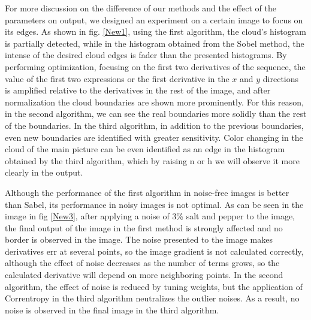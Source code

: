 \documentclass{elsarticle}
\begin{document}
For more discussion on the difference of our methods and the effect of the parameters on output, we designed an experiment on a certain image to focus on its edges.
As shown in fig. \ref{New1}, using the first algorithm, the cloud’s histogram is partially detected, while in the histogram obtained from the Sobel method, the intense of the desired cloud edges is fader than the presented histograms.
By performing optimization, focusing on the first two derivatives of the sequence, the value of the first two expressions or the first derivative in the $x$ and $y$ directions is amplified relative to the derivatives in the rest of the image, and after normalization the cloud boundaries are shown more prominently. For this reason, in the second algorithm, we can see the real boundaries more solidly than the rest of the boundaries. In the third algorithm, in addition to the previous boundaries, even new boundaries are identified with greater sensitivity. Color changing in the cloud of the main picture can be even identified as an edge in the histogram obtained by the third algorithm, which by raising n or h we will observe it more clearly in the output. 

Although the performance of the first algorithm in noise-free images is better than Sabel, its performance in noisy images is not optimal. As can be seen in the image in fig \ref{New3}, after applying a noise of 3\% salt and pepper to the image, the final output of the image in the first method is strongly affected and no border is observed in the image. The noise presented to the image makes derivatives err at several points, so the image gradient is not calculated correctly, although the effect of noise decreases as the number of terms grows, so the calculated derivative will depend on more neighboring points. In the second algorithm, the effect of noise is reduced by tuning weights, but the application of Correntropy in the third algorithm neutralizes the outlier noises. As a result, no noise is observed in the final image in the third algorithm.
\end{document}
